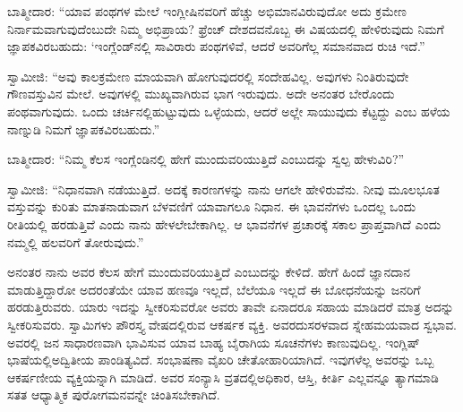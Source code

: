 \vskip 0.1cm

ಬಾತ್ಮೀದಾರ: “ಯಾವ ಪಂಥಗಳ ಮೇಲೆ ಇಂಗ್ಲೀಷಿನವರಿಗೆ ಹೆಚ್ಚು ಅಭಿಮಾನ\-ವಿರುವುದೋ ಅದು ಕ್ರಮೇಣ ನಿರ್ನಾಮವಾಗುವುದೆಂಬುದೇ ನಿಮ್ಮ ಅಭಿಪ್ರಾಯ? ಫ್ರೆಂಚ್​ ದೇಶದವನೊಬ್ಬ ಈ ವಿಷಯದಲ್ಲಿ ಹೇಳಿರುವುದು ನಿಮಗೆ ಜ್ಞಾಪಕವಿರ\break ಬಹುದು: ‘ಇಂಗ್ಲೆಂಡ್​ನಲ್ಲಿ ಸಾವಿರಾರು ಪಂಥಗಳಿವೆ, ಆದರೆ ಅವರಿಗೆಲ್ಲ ಸಮಾನವಾದ ರುಚಿ ಇದೆ.”

\vskip 0.1cm

ಸ್ವಾಮೀಜಿ: “ಅವು ಕಾಲಕ್ರಮೇಣ ಮಾಯವಾಗಿ ಹೋಗುವುದರಲ್ಲಿ ಸಂದೇಹವಿಲ್ಲ. ಅವುಗಳು ನಿಂತಿರುವುದೇ ಗೌಣವಸ್ತುವಿನ ಮೇಲೆ. ಅವುಗಳಲ್ಲಿ ಮುಖ್ಯವಾಗಿರುವ ಭಾಗ ಇರುವುದು. ಅದೇ ಅನಂತರ ಬೇರೊಂದು ಪಂಥವಾಗುವುದು. ಒಂದು ಚರ್ಚಿನಲ್ಲಿ\break ಹುಟ್ಟುವುದು ಒಳ್ಳೆಯದು, ಆದರೆ ಅಲ್ಲೇ ಸಾಯುವುದು ಕೆಟ್ಟದ್ದು ಎಂಬ ಹಳೆಯ ನಾಣ್ನುಡಿ ನಿಮಗೆ ಜ್ಞಾಪಕವಿರಬಹುದು.”

\vskip 0.1cm

ಬಾತ್ಮೀದಾರ: “ನಿಮ್ಮ ಕೆಲಸ ಇಂಗ್ಲೆಂಡಿನಲ್ಲಿ ಹೇಗೆ ಮುಂದುವರಿಯುತ್ತಿದೆ ಎಂಬುದನ್ನು ಸ್ವಲ್ಪ ಹೇಳುವಿರಿ?”

ಸ್ವಾಮೀಜಿ: “ನಿಧಾನವಾಗಿ ನಡೆಯುತ್ತಿದೆ. ಅದಕ್ಕೆ ಕಾರಣಗಳನ್ನು ನಾನು ಆಗಲೇ ಹೇಳಿರುವೆನು. ನೀವು ಮೂಲಭೂತ ವಸ್ತುವನ್ನು ಕುರಿತು ಮಾತನಾಡುವಾಗ ಬೆಳವಣಿಗೆ ಯಾವಾಗಲೂ ನಿಧಾನ. ಈ ಭಾವನೆಗಳು ಒಂದಲ್ಲ ಒಂದು ರೀತಿಯಲ್ಲಿ ಹರಡುತ್ತಿವೆ ಎಂದು ನಾನು ಹೇಳಲೇಬೇಕಾಗಿಲ್ಲ. ಆ ಭಾವನೆಗಳ ಪ್ರಚಾರಕ್ಕೆ ಸಕಾಲ ಪ್ರಾಪ್ತವಾಗಿದೆ ಎಂದು ನಮ್ಮಲ್ಲಿ ಹಲವರಿಗೆ ತೋರುವುದು.”

\vskip 0.1cm

ಅನಂತರ ನಾನು ಅವರ ಕೆಲಸ ಹೇಗೆ ಮುಂದುವರಿಯುತ್ತಿದೆ ಎಂಬುದನ್ನು ಕೇಳಿದೆ. ಹೇಗೆ ಹಿಂದೆ ಜ್ಞಾನದಾನ ಮಾಡುತ್ತಿದ್ದಾರೋ ಅದರಂತೆಯೇ ಯಾವ ಹಣವೂ ಇಲ್ಲದೆ, ಬೆಲೆಯೂ ಇಲ್ಲದೆ ಈ ಬೋಧನೆಯನ್ನು ಜನರಿಗೆ ಹರಡುತ್ತಿರುವರು. ಯಾರು ಇದನ್ನು ಸ್ವೀಕರಿಸುವರೋ ಅವರು ತಾವೇ ಏನಾದರೂ ಸಹಾಯ ಮಾಡಿದರೆ ಮಾತ್ರ ಅದನ್ನು ಸ್ವೀಕರಿಸುವರು. ಸ್ವಾಮಿಗಳು ಪೌರಸ್ತ್ಯ ವೇಷದಲ್ಲಿರುವ ಆಕರ್ಷಕ ವ್ಯಕ್ತಿ. ಅವರದು\break ಸರಳವಾದ ಸ್ನೇಹಮಯವಾದ ಸ್ವಭಾವ. ಅವರಲ್ಲಿ ಜನ ಸಾಧಾರಣವಾಗಿ ಭಾವಿಸುವ ಯಾವ ಬಾಹ್ಯ ಬೈರಾಗಿಯ ಸೂಚನೆಗಳು ಕಾಣುವುದಿಲ್ಲ. ಇಂಗ್ಲಿಷ್​ ಭಾಷೆಯಲ್ಲಿ\break ಅದ್ವಿತೀಯ ಪಾಂಡಿತ್ಯವಿದೆ. ಸಂಭಾಷಣಾ ವೈಖರಿ ಚೇತೋಹಾರಿಯಾಗಿದೆ. ಇವುಗಳೆಲ್ಲ ಅವರನ್ನು ಒಬ್ಬ ಆಕರ್ಷಣೀಯ ವ್ಯಕ್ತಿಯನ್ನಾಗಿ ಮಾಡಿದೆ. ಅವರ ಸಂನ್ಯಾಸಿ ವ್ರತದಲ್ಲಿ\break ಅಧಿಕಾರ, ಆಸ್ತಿ, ಕೀರ್ತಿ ಎಲ್ಲವನ್ನೂ ತ್ಯಾಗಮಾಡಿ ಸತತ ಆಧ್ಯಾತ್ಮಿಕ ಪುರೋಗಮನವನ್ನೇ ಚಿಂತಿಸಬೇಕಾಗಿದೆ.

